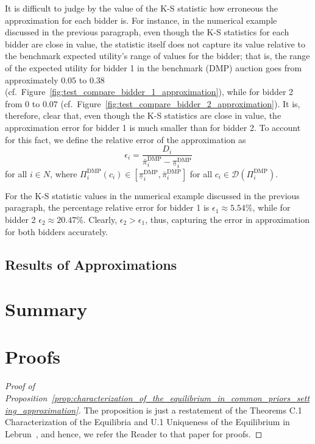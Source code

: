 It is difficult to judge by the value of the K-S statistic how erroneous the approximation for each bidder is. For instance, in the numerical example discussed in the previous paragraph, even though the K-S statistics for each bidder are close in value, the statistic itself does not capture its value relative to the benchmark expected utility's range of values for the bidder; that is, the range of the expected utility for bidder 1 in the benchmark (DMP) auction goes from approximately $0.05$ to $0.38$ (cf.~Figure~\ref{fig:test_compare_bidder_1_approximation}), while for bidder 2 from $0$ to $0.07$ (cf.~Figure~\ref{fig:test_compare_bidder_2_approximation}). It is, therefore, clear that, even though the K-S statistics are close in value, the approximation error for bidder 1 is much smaller than for bidder 2. To account for this fact, we define the relative error of the approximation as
\begin{equation}
  \label{eq:relative_error_approximation}
  \epsilon_i = \frac{D_i}{\bar{\pi}_i^{\textrm{DMP}} - \underline{\pi}_i^{\textrm{DMP}}}
\end{equation}
for all $i\in N$, where $\Pi_i^{\textrm{DMP}}(c_i)\in [\underline{\pi}_i^{\textrm{DMP}}, \bar{\pi}_i^{\textrm{DMP}}]$ for all $c_i\in \mathscr{D}(\Pi_i^{\textrm{DMP}})$.

For the K-S statistic values in the numerical example discussed in the previous paragraph, the percentage relative error for bidder 1 is $\epsilon_1\approx 5.54\%$, while for bidder 2 $\epsilon_2\approx 20.47\%$. Clearly, $\epsilon_2 > \epsilon_1$, thus, capturing the error in approximation for both bidders accurately.

\subsection{Results of Approximations} %
\label{sub:results_of_approximations_approximation}



\section{Summary} %
\label{sec:summary_approximation}


\section{Proofs} %
\label{sec:proofs_approximation}
\begin{proof}[Proof of Proposition~\ref{prop:characterization_of_the_equilibrium_in_common_priors_setting_approximation}]
The proposition is just a restatement of the Theorems C.1 Characterization of the Equilibria and U.1 Uniqueness of the Equilibrium in Lebrun~\cite{Lebrun2006}, and hence, we refer the Reader to that paper for proofs.
\end{proof}

